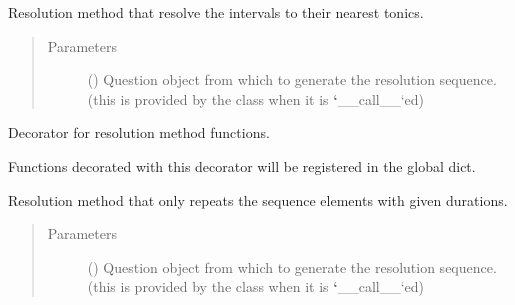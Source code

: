 \documentclass[letterpaper,10pt,english]{sphinxmanual}
\begin{document}

\begin{fulllineitems}
\label{\detokenize{index:birdears.resolution.nearest_tonic}}
Resolution method that resolve the intervals to their nearest tonics.
\begin{quote}\begin{description}
\item[{Parameters}] \leavevmode
{} () \textendash{} Question object from which to generate the
resolution sequence. (this is provided by the  class
when it is {\color{red}\bfseries{}{}`}\_\_call\_\_{}`ed)

\end{description}\end{quote}

\end{fulllineitems}


\begin{fulllineitems}
\label{\detokenize{index:birdears.resolution.register_resolution_method}}
Decorator for resolution method functions.

Functions decorated with this decorator will be registered in the
 global dict.

\end{fulllineitems}


\begin{fulllineitems}
\label{\detokenize{index:birdears.resolution.repeat_only}}
Resolution method that only repeats the sequence elements with given
durations.
\begin{quote}\begin{description}
\item[{Parameters}] \leavevmode
{} () \textendash{} Question object from which to generate the
resolution sequence. (this is provided by the  class
when it is {\color{red}\bfseries{}{}`}\_\_call\_\_{}`ed)

\end{description}\end{quote}

\end{fulllineitems}
\end{document}
